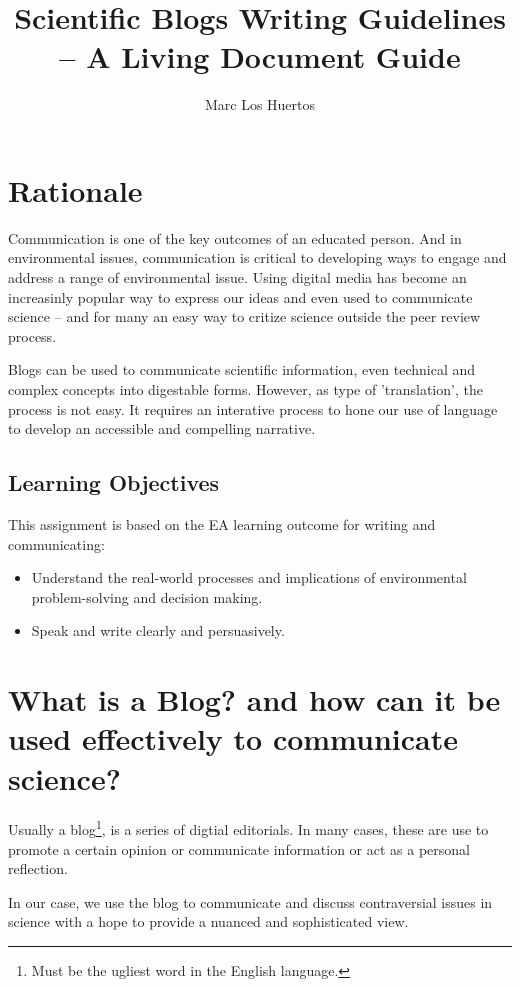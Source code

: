 \documentclass{tufte-handout}\usepackage[]{graphicx}\usepackage[]{color}
\title{Scientific Blogs Writing Guidelines -- A Living Document Guide %
}
\author[Marc Los Huertos]{Marc Los Huertos}
\begin{document}
\maketitle

\section{Rationale}

Communication is one of the key outcomes of an educated person. And in environmental issues, communication is critical to developing ways to engage and address a range of environmental issue. Using digital media has become an increasinly popular way to express our ideas and even used to communicate science -- and for many an easy way to critize science outside the peer review process. 

Blogs can be used to communicate scientific information, even technical and complex concepts into digestable forms. However, as type of 'translation', the process is not easy. It requires an interative process to hone our use of language to develop an accessible and compelling narrative. 

\subsection{Learning Objectives}

This assignment is based on the EA learning outcome for writing and communicating: 

\begin{itemize}
	\item Understand the real-world processes and implications of environmental problem-solving and decision making.
	\item Speak and write clearly and persuasively.
\end{itemize}

\section{What is a Blog? and how can it be used effectively to communicate science?}

Usually a blog\footnote{Must be the ugliest word in the English language.}, is a series of digtial editorials. In many cases, these are use to promote a certain opinion or communicate information or act as a personal reflection. 

In our case, we use the blog to communicate and discuss contraversial issues in science with a hope to provide a nuanced and sophisticated view. 
\end{document}
